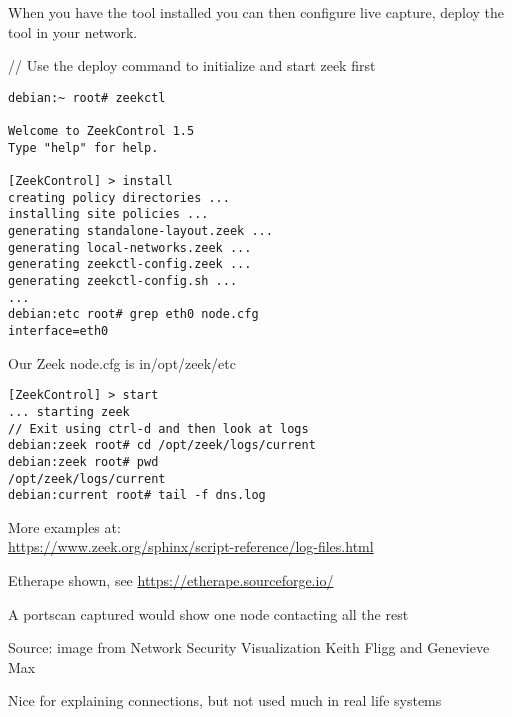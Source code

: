 \documentclass[Screen16to9,17pt]{foils}
\begin{document}
When you have the tool installed you can then configure live capture, deploy the tool in your network.


// Use the deploy command to initialize and start zeek first
\begin{verbatim}
debian:~ root# zeekctl

Welcome to ZeekControl 1.5
Type "help" for help.

[ZeekControl] > install
creating policy directories ...
installing site policies ...
generating standalone-layout.zeek ...
generating local-networks.zeek ...
generating zeekctl-config.zeek ...
generating zeekctl-config.sh ...
...
debian:etc root# grep eth0 node.cfg
interface=eth0
\end{verbatim}

\centerline{Our Zeek node.cfg is in/opt/zeek/etc}


\begin{verbatim}
[ZeekControl] > start
... starting zeek
// Exit using ctrl-d and then look at logs
debian:zeek root# cd /opt/zeek/logs/current
debian:zeek root# pwd
/opt/zeek/logs/current
debian:current root# tail -f dns.log
\end{verbatim}

More examples at:\\
\url{https://www.zeek.org/sphinx/script-reference/log-files.html}






\begin{list2}
\item Etherape shown, see \url{https://etherape.sourceforge.io/}
\item A portscan captured would show one node contacting all the rest
\end{list2}



Source: image from Network Security Visualization Keith Fligg and Genevieve Max\\{\footnotesize
{}}

\begin{list2}
\item {}
\item Nice for explaining connections, but not used much in real life systems
\end{list2}
\end{document}
